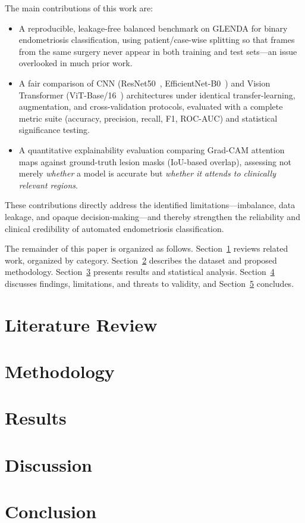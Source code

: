\documentclass[journal]{IEEEtran}
\begin{document}
\noindent The main contributions of this work are:
\begin{itemize}
  \item A reproducible, leakage-free balanced benchmark on GLENDA for binary endometriosis
        classification, using patient/case-wise splitting so that frames from the same surgery
        never appear in both training and test sets---an issue overlooked in much prior work.
  \item A fair comparison of CNN (ResNet50~\cite{ref_resnet}, EfficientNet-B0~\cite{ref_efficientnet})
        and Vision Transformer (ViT-Base/16~\cite{ref_vit}) architectures under identical
        transfer-learning, augmentation, and cross-validation protocols, evaluated with a complete
        metric suite (accuracy, precision, recall, F1, ROC-AUC) and statistical significance testing.
  \item A quantitative explainability evaluation comparing Grad-CAM attention maps against
        ground-truth lesion masks (IoU-based overlap), assessing not merely \emph{whether} a model
        is accurate but \emph{whether it attends to clinically relevant regions}.
\end{itemize}

These contributions directly address the identified limitations---imbalance, data leakage, and
opaque decision-making---and thereby strengthen the reliability and clinical credibility of
automated endometriosis classification.

The remainder of this paper is organized as follows. Section~\ref{sec:related} reviews related work,
organized by category. Section~\ref{sec:method} describes the dataset and proposed methodology.
Section~\ref{sec:results} presents results and statistical analysis. Section~\ref{sec:discussion}
discusses findings, limitations, and threats to validity, and Section~\ref{sec:conclusion} concludes.

\section{Literature Review}\label{sec:related}

\section{Methodology}\label{sec:method}

\section{Results}\label{sec:results}

\section{Discussion}\label{sec:discussion}

\section{Conclusion}\label{sec:conclusion}



\end{document}
